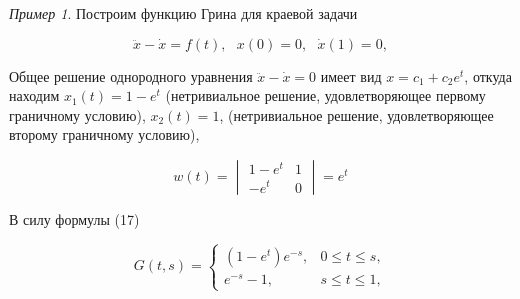 \documentclass{article}
\theoremstyle{plain} \newtheorem*{theorem*}{Теорема}
\theoremstyle{plain} \newtheorem{theorem}{Теорема}[section]
\theoremstyle{defintition} \newtheorem*{corollary*}{Следствие}
\theoremstyle{remark} \newtheorem*{example*}{Пример}
\theoremstyle{remark} \newtheorem*{remark*}{Замечание}
\begin{document}
\begin{example*}

    Построим функцию Грина для краевой задачи

    \begin{equation*}
        \ddot{x} - \dot{x} = f(t), \ \ \ x(0) = 0,
        \ \ \ \dot{x}(1) = 0,
    \end{equation*}

    Общее решение однородного уравнения
    $\ddot{x} - \dot{x} = 0$ имеет вид $x = c_1 + c_2 e^t$,
    откуда находим $x_1(t) = 1 - e^t$ (нетривиальное решение,
    удовлетворяющее первому граничному условию), $x_2(t) = 1$,
    (нетривиальное решение, удовлетворяющее второму граничному
    условию),

    \begin{equation*}
        w(t) =
        \begin{vmatrix}
            1 - e^t & 1 \\
            -e^t & 0
        \end{vmatrix} = e^t
    \end{equation*}

    В силу формулы (17)

    \begin{equation*}
        G(t,s) =
        \begin{cases}
            (1 - e^t)e^{-s}, &0 \le t \le s, \\
            e^{-s} - 1, &s \le t \le 1,
        \end{cases}
    \end{equation*}


\end{example*}
\end{document}
